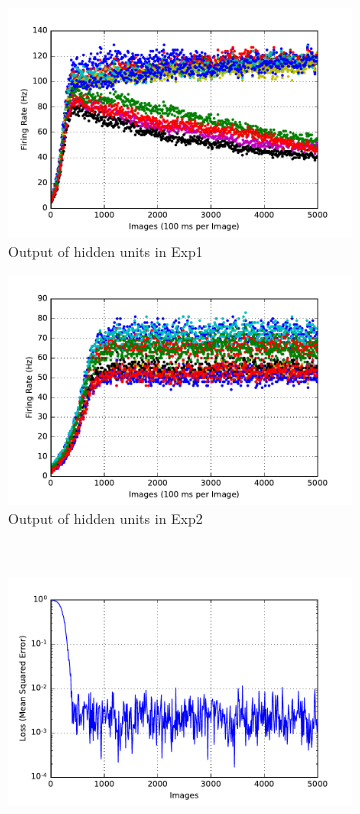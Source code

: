\begin{figure}
\begin{subfigure}[t]{0.4\textwidth}
		\includegraphics[width=\textwidth]{pics_sdlm/13_exp_SRBM_noise_long/exp1_hid_s.pdf}
		\caption{Output of hidden units in Exp1}
	\end{subfigure}
	\begin{subfigure}[t]{0.4\textwidth}
		\includegraphics[width=\textwidth]{pics_sdlm/13_exp_SRBM_noise_long/exp2_hid_s.pdf}
		\caption{Output of hidden units in Exp2}
	\end{subfigure}\\
	\begin{subfigure}[t]{0.4\textwidth}
		\includegraphics[width=\textwidth]{pics_sdlm/13_exp_SRBM_noise_long/exp1_mse_nons.pdf}

\end{subfigure}
\end{figure}

